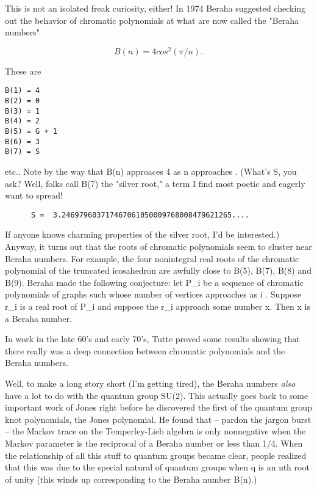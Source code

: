 This is not an isolated freak curiosity, either!  In 1974 Beraha
suggested checking out the behavior of chromatic polynomials at what are
now called the "Beraha numbers"

$$
                    B(n) = 4 cos^2(\pi /n).
$$
    

These are

\begin{verbatim}
B(1) = 4
B(2) = 0
B(3) = 1
B(4) = 2
B(5) = G + 1
B(6) = 3
B(7) = S
\end{verbatim}
    

etc..  Note by the way that B(n) approaces 4 as n approaches \infty .
(What's S, you ask?  Well, folks call B(7) the "silver root," a term I
find most poetic and eagerly want to spread!   

\begin{verbatim}
      S =  3.246979603717467061050009768008479621265....
\end{verbatim}
    

If anyone knows charming properties of the silver root, I'd be
interested.)  Anyway, it turns out that the roots of chromatic
polynomials seem to cluster near Beraha numbers.  For example, the four
nonintegral real roots of the chromatic polynomial of the truncated
icosahedron are awfully close to B(5), B(7), B(8) and B(9).  Beraha made
the following conjecture: let P_i be a sequence of chromatic polynomials
of graphs such whose number of vertices approaches \infty  as i \to 
\infty .  Suppose r_i is a real root of P_i and suppose the r_i
approach some number x.  Then x is a Beraha number.

In work in the late 60's and early 70's, Tutte proved some results
showing that there really was a deep connection between chromatic
polynomials and the Beraha numbers.  

Well, to make a long story short (I'm getting tired), the Beraha numbers
\emph{also} have a lot to do with the quantum group SU(2).  This actually
goes back to some important work of Jones right before he discovered the
first of the quantum group knot polynomials, the Jones polynomial.  He
found that -- pardon the jargon burst -- the Markov trace on the
Temperley-Lieb algebra is only nonnegative when the Markov parameter is
the reciprocal of a Beraha number or less than 1/4.  When the
relationship of all this stuff to quantum groups became clear, people
realized that this was due to the special natural of quantum groups when
q is an nth root of unity (this winds up corresponding to the Beraha
number B(n).)  

